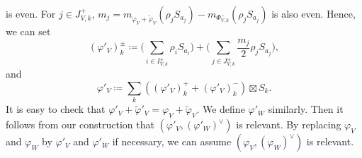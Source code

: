 \documentclass[11pt,letterpaper]{amsart}
\theoremstyle{plain}
\numberwithin{theorem}{section}
\numberwithin{equation}{subsection}
\theoremstyle{remark}
\begin{document}
is even. For $j\in J_{V,k}^+$, $m_j = m_{\varphi_V + \widetilde{\varphi}_V}\left(\rho_j S_{a_j}\right) - m_{\Phi_{V,k}^-}\left(\rho_j S_{a_j}\right)$ is also even. Hence, we can set
\[
    \left(\varphi'_{V}\right)_k^\pm \coloneqq \Big(\sum_{i\in I_{V,k}^\pm} \rho_i S_{a_i}\Big) + \Big(\sum_{j\in J_{V,k}^\pm} \frac{m_j}{2}\rho_j S_{a_j}\Big),
\]
and
\[
    \varphi'_V \coloneqq \sum_k \left(\left(\varphi'_{V}\right)_k^+ + \left(\varphi'_{V}\right)_k^-\right)\boxtimes S_k.
\]
It is easy to check that $\varphi'_V + \widetilde{\varphi}'_V = \varphi_V + \widetilde{\varphi}_V$. We define $\varphi'_W$ similarly. Then it follows from our construction that $\left(\varphi'_V, \left(\varphi'_W\right)^\vee\right)$ is relevant. By replacing $\varphi_V$ and $\varphi_W$ by $\varphi'_V$ and $\varphi'_W$ if necessary, we can assume $\left(\varphi_V, \left(\varphi_W\right)^\vee\right)$ is relevant.

\vskip 5pt
\end{document}
